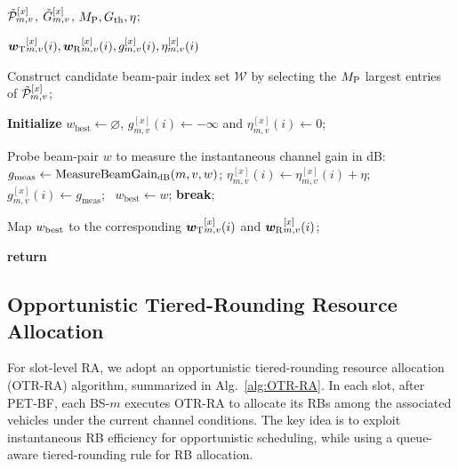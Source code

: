 \documentclass[conference, a4paper]{IEEEtran}
\theoremstyle{remark}
\begin{document}
\begin{algorithm}[tbp]
    \caption{Predictive Early-Termination Beamforming (PET-BF)}
    \label{alg:predictive BF}
    \renewcommand{\algorithmicrequire}{\textbf{Input:}}
    \renewcommand{\algorithmicensure}{\textbf{Output:}}
    \begin{algorithmic}[1]
        \REQUIRE
        $\Tilde{\mathcal{P}}_{m,v}^{[x]}$, $\Tilde{G}_{m,v}^{[x]}$, $M_{\rm P}, G_{\rm th}, \eta$;
        
        \ENSURE
        ${\bm{w}_{\rm T}}_{m,v}^{[x]}(i),{\bm{w}_{\rm R}}_{m,v}^{[x]}(i), g_{m,v}^{[x]}(i), \eta_{m,v}^{[x]}(i)$

        \STATE Construct candidate beam-pair index set $\mathcal{W}$
        by selecting the $M_{\rm P}$ largest entries of
        $\Tilde{\mathcal{P}}_{m,v}^{[x]}$;
        
        \STATE \textbf{Initialize} $w_{\text{best}} \leftarrow \varnothing$, $g_{m,v}^{[x]}(i) \leftarrow -\infty$ and $\eta_{m,v}^{[x]}(i) \leftarrow 0$;
        
            \STATE Probe beam-pair $w$ to measure the instantaneous channel gain in dB: $g_{\rm meas} \gets \text{MeasureBeamGain}_{\rm dB}(m,v,w)$;
            \STATE $\eta_{m,v}^{[x]}(i) \leftarrow \eta_{m,v}^{[x]}(i) + \eta$;
                \STATE $g_{m,v}^{[x]}(i) \leftarrow g_{\text{meas}}$; \ $w_{\text{best}} \leftarrow w$;
            \ENDIF
                \STATE \textbf{break};
            \ENDIF
        \ENDFOR
        
        \STATE Map $w_{\rm best}$ to the corresponding ${\bm{w}_{\rm T}}_{m,v}^{[x]}(i)$ and ${\bm{w}_{\rm R}}_{m,v}^{[x]}(i)$;

        
        \STATE \textbf{return} 
    \end{algorithmic}
\end{algorithm}


\subsection{Opportunistic Tiered-Rounding Resource Allocation}
\label{subsection:OTR-RA strategy}

For slot-level RA, we adopt an opportunistic tiered-rounding resource allocation (OTR-RA) algorithm, summarized in Alg.~\ref{alg:OTR-RA}. In each slot, after PET-BF, each BS-$m$ executes OTR-RA to allocate its RBs among the associated vehicles under the current channel conditions. The key idea is to exploit instantaneous RB efficiency for opportunistic scheduling, while using a queue-aware tiered-rounding rule for RB allocation.
\end{document}
